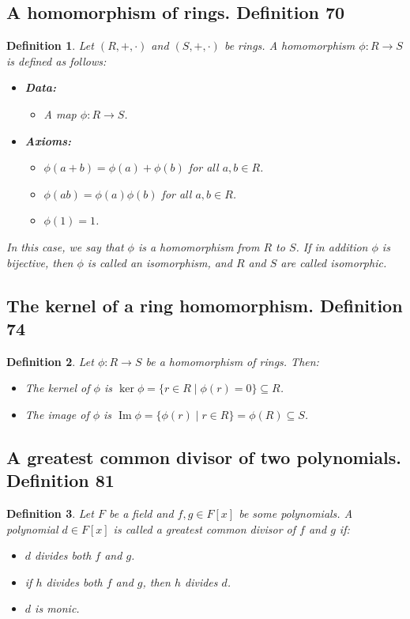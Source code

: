 \documentclass{article}
\newtheorem*{customdefinition}{Definition}
\begin{document}
\subsection*{A homomorphism of rings. Definition 70}
\begin{customdefinition}
Let $(R,+, \cdot)$ and $(S,+, \cdot)$ be rings. A homomorphism $\phi : R \rightarrow S$ is defined as follows:
\begin{itemize}
    \item \textbf{Data:}
        \begin{itemize}
            \item A map $\phi : R \rightarrow S$.
        \end{itemize}
    \item \textbf{Axioms:}
        \begin{itemize}
            \item $\phi(a+b) = \phi(a) + \phi(b)$ for all $a, b \in R$.
            \item $\phi(ab) = \phi(a) \phi(b)$ for all $a, b \in R$.
            \item $\phi(1) = 1$.
        \end{itemize}
\end{itemize}
In this case, we say that $\phi$ is a homomorphism from $R$ to $S$. If in addition $\phi$ is bijective, then $\phi$ is called an isomorphism, and $R$ and $S$ are called isomorphic.
\end{customdefinition}

\subsection*{The kernel of a ring homomorphism. Definition 74}
\begin{customdefinition}
Let $\phi : R \rightarrow S$ be a homomorphism of rings. Then:
\begin{itemize}
    \item The kernel of $\phi$ is $\ker \phi = \{r \in R \mid \phi(r) = 0\} \subseteq R$.
    \item The image of $\phi$ is $\operatorname{Im} \phi = \{\phi(r) \mid r \in R\} = \phi(R) \subseteq S$.
\end{itemize}
\end{customdefinition}

\subsection*{A greatest common divisor of two polynomials. Definition 81}
\begin{customdefinition}
Let \( F \) be a field and \( f, g \in F[x] \) be some polynomials. A polynomial \( d \in F[x] \) is called a greatest common divisor of \( f \) and \( g \) if:
\begin{itemize}
    \item \( d \) divides both \( f \) and \( g \).
    \item if \( h \) divides both \( f \) and \( g \), then \( h \) divides \( d \).
    \item \( d \) is monic.
\end{itemize}
\end{customdefinition}
\end{document}
